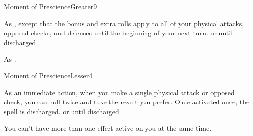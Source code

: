 \begin{spellsection}{Moment of Prescience}{Greater}{9}
\begin{spellheader}
\end{spellheader}
\begin{spellcontent}
    \begin{spelltargetinginfo}
    \end{spelltargetinginfo}
    \begin{spelleffects}
        \spelleffect As , except that the bonus and extra rolls apply to all of your physical attacks, opposed checks, and defenses until the beginning of your next turn.
        \spelldur \durext or until discharged
    \end{spelleffects}
\end{spellcontent}
\begin{spellfooter}
    \spellnotes As .
\end{spellfooter}
\end{spellsection}

\begin{spellsection}{Moment of Prescience}{Lesser}{4}
\begin{spellheader}
\end{spellheader}
\begin{spellcontent}
    \begin{spelltargetinginfo}
    \end{spelltargetinginfo}
    \begin{spelleffects}
        \spelleffect As an immediate action, when you make a single physical attack or opposed check, you can roll twice and take the result you prefer. Once activated once, the spell is discharged.
        \spelldur \durext or until discharged
    \end{spelleffects}
\end{spellcontent}
\begin{spellfooter}
    \spellnotes You can't have more than one  effect active on you at the same time.
\end{spellfooter}

\begin{comment}
\subsubsection{O-P}
\end{comment}
\end{spellsection}


